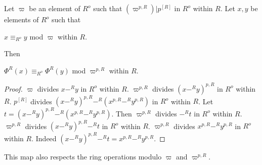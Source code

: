 \documentclass[11pt]{article}
\begin{document}
\begin{forthel}

\begin{lemma}Let $\varpi$ be an element of $R^o$ such that
$(\varpi^{p,R}) | p^{[R]}$ in $R^o$ within $R$.
Let $x,y$ be elements of $R^o$ such that

$x \equiv_{R^o} y$ mod $\varpi$ within $R$.

Then 

$\Phi^{R}(x) \equiv_{R^o} \Phi^{R}(y)$ mod $\varpi^{p,R}$ within $R$.
\end{lemma}
\begin{proof}
$\varpi$ divides $x -^{R} y$ in $R^o$ within $R$.
$\varpi^{p,R}$ divides $(x -^{R} y)^{p,R}$ in $R^o$ within $R$.
$p^{[R]}$ divides $(x -^{R} y)^{p,R} -^{R} (x^{p,R} -^{R} y^{p,R})$ in $R^o$ within $R$.
Let $t = (x -^{R} y)^{p,R} -^{R} (x^{p,R} -^{R} y^{p,R})$.
Then $\varpi^{p,R}$ divides $-^{R} t$ in $R^o$ within $R$.
$\varpi^{p,R}$ divides $(x -^{R} y)^{p,R} -^{R} t$ in $R^o$ within $R$.
$\varpi^{p,R}$ divides $x^{p,R} -^{R} y^{p,R}$ in $R^o$ within $R$.
Indeed $(x -^{R} y)^{p,R} -^{R} t = x^{p,R} -^{R} y^{p,R}$.
\end{proof}

\end{forthel}

This map also respects the ring operations modulo 
$\varpi$ and $\varpi^{p,R}$.
\end{document}
